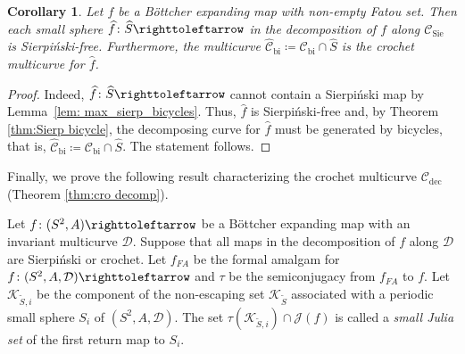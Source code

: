\documentclass{amsart}
\theoremstyle{plain}
\newtheorem{corollary}[theorem]{Corollary}
\theoremstyle{definition}
\theoremstyle{remark}
\newcommand{\Jul}{{\mathcal J}}
\newcommand{\KC}{{\mathcal K}}
\newcommand{\CC}{{\mathcal C}}
\newcommand{\DD}{{\mathcal D}}
\newcommand{\bi}{{\operatorname{bi}}}
\newcommand\selfmap{\righttoleftarrow}
\newcommand{\cro}{{\operatorname{dec}}}
\newcommand{\Sie}{{\operatorname{Sie}}}
\begin{document}
\begin{corollary}Let $f$ be a B\"ottcher expanding map with non-empty Fatou set.  Then each small sphere $\widehat f\colon \widehat S\selfmap$ in the decomposition of $f$ along $\CC_\Sie$ is Sierpi\'{n}ski-free.  Furthermore,  the multicurve $\widehat \CC_\bi\coloneq \CC_\bi \cap \widehat S$ is the crochet multicurve for $\widehat f$.  
\end{corollary}
\begin{proof}
Indeed,   $\widehat f\colon \widehat S\selfmap$ cannot contain a Sierpi\'{n}ski map by Lemma~\ref{lem: max_sierp_bicycles}.  Thus, $\widehat f$ is  Sierpi\'{n}ski-free and, by  Theorem \ref{thm:Sierp bicycle},  the decomposing curve for $\widehat f$ must be generated by bicycles,  that is,  $\widehat \CC_\bi\coloneq \CC_\bi \cap \widehat S$. The statement follows. 
\end{proof}


Finally, we prove the following result characterizing the crochet multicurve $\CC_\cro$ (Theorem \ref{thm:cro decomp}).


Let $f\colon(S^2,A)\selfmap$ be a B\"ottcher expanding map with an invariant multicurve $\DD$. Suppose that all maps in the decomposition of $f$ along $\DD$ are Sierpi\'{n}ski or crochet. Let $f_{FA}$ be the formal amalgam for $f\colon(S^2,A, \DD)\selfmap$ and $\tau$ be the semiconjugacy from $f_{FA}$ to $f$. Let $\KC_{\widetilde S,i}$ be the component of the non-escaping set $\KC_{\widetilde S}$ associated with a periodic small sphere $S_i$ of $(S^2,A,\DD)$. The set $\tau(\KC_{\widetilde S,i})\cap \Jul(f)$ is called a \emph{small Julia set} of the first return map to $S_i$.
\end{document}
